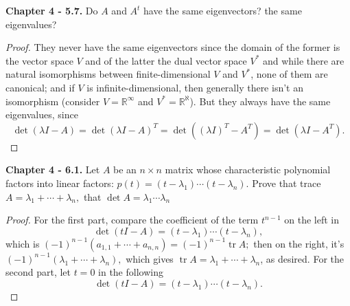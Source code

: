 \documentclass[10pt]{report}
\theoremstyle{definition}
\begin{document}
\textbf{Chapter 4 - 5.7.} Do $A$ and $A^{t}$ have the same eigenvectors? the same eigenvalues?
\begin{proof}
They never have the same eigenvectors since the domain of the former is the vector space $V$ and of the latter the dual vector space $V^*$ and while there are natural isomorphisms between finite-dimensional $V$ and $V^*$, none of them are canonical; and if $V$ is infinite-dimensional, then generally there isn't an isomorphism (consider $V=\mathbb{R}^\infty$ and $V^*=\mathbb{R}^\aleph$). But they always have the same eigenvalues, since $$\det(\lambda I-A)=\det(\lambda I-A)^T=\det((\lambda I)^T-A^T)=\det(\lambda I-A^T).$$
\end{proof}

\textbf{Chapter 4 - 6.1.} Let $A$ be an $n \times n$ matrix whose characteristic polynomial factors into linear factors:
$p(t)=\left(t-\lambda_{1}\right) \cdots\left(t-\lambda_{n}\right) .$ Prove that trace $A=\lambda_{1}+\cdots+\lambda_{n},$ that $\operatorname{det} A=\lambda_{1} \cdots \lambda_{n}$
\begin{proof}
For the first part, compare the coefficient of the term $t^{n-1}$ on the left in
$$\det(tI-A)=(t-\lambda_1)\cdots(t-\lambda_n),$$
which is $(-1)^{n-1}(a_{1,1}+\cdots+a_{n,n})=(-1)^{n-1}\operatorname{tr}A;$
then on the right, it's $(-1)^{n-1}(\lambda_1+\cdots+\lambda_n),$
which gives $\operatorname{tr}A=\lambda_1+\cdots+\lambda_n$, as desired.
For the second part, let $t=0$ in the following
$$\det(tI-A)=(t-\lambda_1)\cdots(t-\lambda_n).$$
\end{proof}
\end{document}

